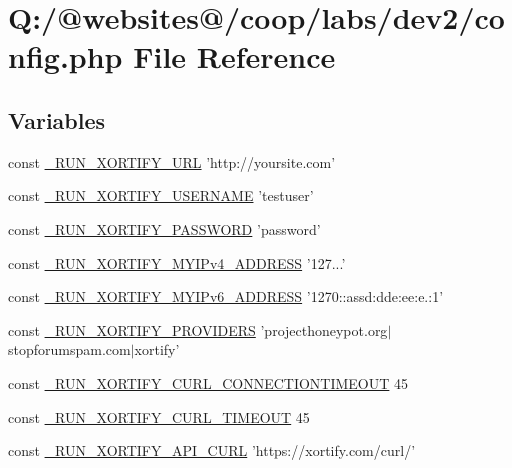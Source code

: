 \hypertarget{config_8php}{\section{Q\-:/@websites@/coop/labs/dev2/config.php File Reference}
\label{config_8php}
}
\subsection*{Variables}
\begin{DoxyCompactItemize}
\item 
const \hyperlink{config_8php_a5447f78366103b7f936ad66b5ad699bc}{\-\_\-\-R\-U\-N\-\_\-\-X\-O\-R\-T\-I\-F\-Y\-\_\-\-U\-R\-L} 'http\-://yoursite.\-com'
\item 
const \hyperlink{config_8php_aa02ebbee96fcfc55cf7226ee79ec639f}{\-\_\-\-R\-U\-N\-\_\-\-X\-O\-R\-T\-I\-F\-Y\-\_\-\-U\-S\-E\-R\-N\-A\-M\-E} 'testuser'
\item 
const \hyperlink{config_8php_a81e335d2aeeafa8ec9619df3ee0718fc}{\-\_\-\-R\-U\-N\-\_\-\-X\-O\-R\-T\-I\-F\-Y\-\_\-\-P\-A\-S\-S\-W\-O\-R\-D} 'password'
\item 
const \hyperlink{config_8php_abbe0c22c2462976229b0d87eff73eee5}{\-\_\-\-R\-U\-N\-\_\-\-X\-O\-R\-T\-I\-F\-Y\-\_\-\-M\-Y\-I\-Pv4\-\_\-\-A\-D\-D\-R\-E\-S\-S} '127...'
\item 
const \hyperlink{config_8php_a73baf5f81049def848983ef1f0ab3d1b}{\-\_\-\-R\-U\-N\-\_\-\-X\-O\-R\-T\-I\-F\-Y\-\_\-\-M\-Y\-I\-Pv6\-\_\-\-A\-D\-D\-R\-E\-S\-S} '1270\-::assd\-:dde\-:ee\-:e.\-:1'
\item 
const \hyperlink{config_8php_a134c3746f74ab23092519397cdbef2a3}{\-\_\-\-R\-U\-N\-\_\-\-X\-O\-R\-T\-I\-F\-Y\-\_\-\-P\-R\-O\-V\-I\-D\-E\-R\-S} 'projecthoneypot.\-org$|$stopforumspam.\-com$|$xortify'
\item 
const \hyperlink{config_8php_a6e60b203bc5a1ebf89e1c897e12289af}{\-\_\-\-R\-U\-N\-\_\-\-X\-O\-R\-T\-I\-F\-Y\-\_\-\-C\-U\-R\-L\-\_\-\-C\-O\-N\-N\-E\-C\-T\-I\-O\-N\-T\-I\-M\-E\-O\-U\-T} 45
\item 
const \hyperlink{config_8php_afc403306d30c059264ea7aa81aa0215b}{\-\_\-\-R\-U\-N\-\_\-\-X\-O\-R\-T\-I\-F\-Y\-\_\-\-C\-U\-R\-L\-\_\-\-T\-I\-M\-E\-O\-U\-T} 45
\item 
const \hyperlink{config_8php_aece8c84e9ee1b6c2709ae3cb9f831a87}{\-\_\-\-R\-U\-N\-\_\-\-X\-O\-R\-T\-I\-F\-Y\-\_\-\-A\-P\-I\-\_\-\-C\-U\-R\-L} 'https\-://xortify.\-com/curl/'
\item 

\end{DoxyCompactItemize}
